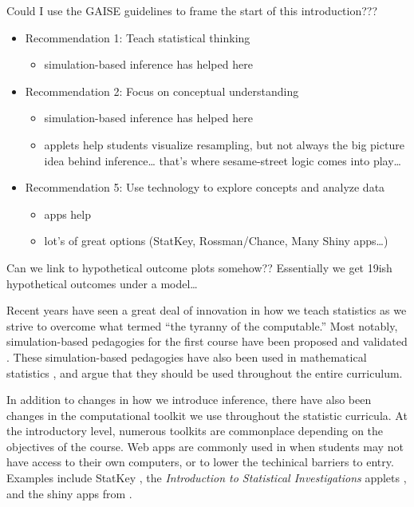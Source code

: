 \documentclass[12pt]{article}
\providecommand{\tightlist}{%
  \setlength{\itemsep}{0pt}\setlength{\parskip}{0pt}}
\begin{document}
Could I use the GAISE guidelines to frame the start of this
introduction???

\begin{itemize}
\tightlist
\item
  Recommendation 1: Teach statistical thinking

  \begin{itemize}
  \tightlist
  \item
    simulation-based inference has helped here
  \end{itemize}
\item
  Recommendation 2: Focus on conceptual understanding

  \begin{itemize}
  \tightlist
  \item
    simulation-based inference has helped here
  \item
    applets help students visualize resampling, but not always the big
    picture idea behind inference\ldots{} that's where sesame-street
    logic comes into play\ldots{}
  \end{itemize}
\item
  Recommendation 5: Use technology to explore concepts and analyze data

  \begin{itemize}
  \tightlist
  \item
    apps help
  \item
    lot's of great options (StatKey, Rossman/Chance, Many Shiny
    apps\ldots{})
  \end{itemize}
\end{itemize}

Can we link to hypothetical outcome plots somehow?? Essentially we get
19ish hypothetical outcomes under a model\ldots{}

Recent years have seen a great deal of innovation in how we teach
statistics as we strive to overcome what \citet{Cobb-2007uo} termed
``the tyranny of the computable.'' Most notably, simulation-based
pedagogies for the first course have been proposed and validated
\citep{Cobb-2007uo, Tintle-2011vo, Tintle-2012td, Maurer-2014te, Tintle2014-vt, Hildreth2018}.
These simulation-based pedagogies have also been used in mathematical
statistics \citep{chihara2011, Cobb2011-vz}, and \citet{Tintle2015-yv}
argue that they should be used throughout the entire curriculum.

In addition to changes in how we introduce inference, there have also
been changes in the computational toolkit we use throughout the
statistic curricula. At the introductory level, numerous toolkits are
commonplace depending on the objectives of the course. Web apps are
commonly used in when students may not have access to their own
computers, or to lower the techinical barriers to entry. Examples
include StatKey \citep{Lock2017}, the \emph{Introduction to Statistical
Investigations} applets \citep{tintle2015}, and the shiny apps from
\citet{agresti2017}.
\end{document}
